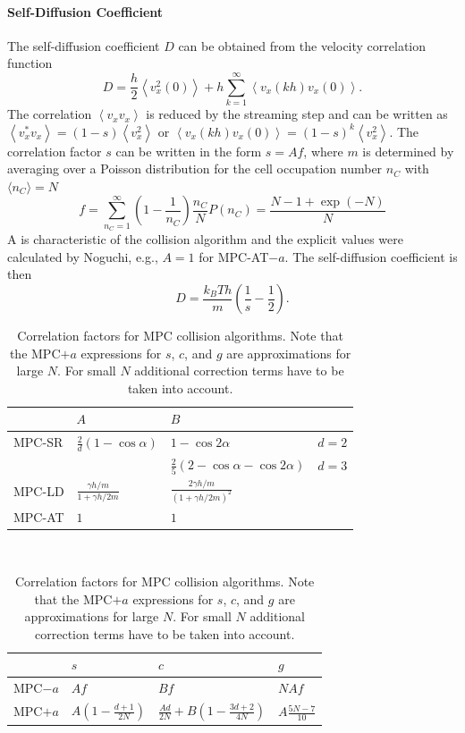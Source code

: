 \documentclass[8.5pt,twoside,twocolumn]{article}
\begin{document}
\paragraph{Self-Diffusion Coefficient}

The self-diffusion coefficient $D$ can be obtained from  the velocity correlation function
%
\begin{equation}
D= \frac{h}{2} \left\langle v_x^2(0) \right\rangle + h \sum_{k=1}^{\infty} \left\langle v_x(kh) v_x(0) \right\rangle .
\end{equation}
%
The correlation $\left\langle v_x v_x \right\rangle$ is reduced by the streaming step and can be written as $\left\langle v_x^* v_x \right\rangle = (1-s) \left\langle v_x^2 \right\rangle$ or $\left\langle v_x(kh) v_x(0) \right\rangle=(1-s)^k \left\langle v_x^2 \right\rangle$. The correlation factor $s$ can be written in the form $s=Af$, where $m$ is determined by averaging over a Poisson distribution for the cell occupation number $n_C$ with $\langle n_C \rangle = N$
%
\begin{equation}
  f = \sum_{n_C=1}^{\infty} \left(1-\frac{1}{n_C}\right) \frac{n_C}{N} P(n_C) = \frac{N-1+\exp(-N)}{N}
\end{equation}
%
A is characteristic of the collision algorithm and the explicit values were calculated by Noguchi\cite{Noguchi:2008}, e.g., $A=1$ for MPC-AT$-a$. The self-diffusion coefficient is then
%
\begin{equation}
  D %
  = \frac{k_B T h}{m} \left( \frac{1}{s} - \frac{1}{2} \right) .
\end{equation}

\begin{table}\centering
\begin{tabular}{l|l|l|l}
  \hline
  & $A$ & $B$ \\
  \hline
  MPC-SR & $\frac{2}{d}(1-\cos\alpha)$ & $1-\cos2\alpha$ & $d=2$ \\
  & & $\frac{2}{5}(2-\cos\alpha-\cos2\alpha)$ & $d=3$ \\
  MPC-LD & $\frac{\gamma h/m}{1+\gamma h/2m}$ & $\frac{2\gamma h/m}{(1+\gamma h/2m)^2}$ \\
  MPC-AT & $1$ & $1$ \\
  \hline
\end{tabular}
\vspace*{\baselineskip}\\
\begin{tabular}{llll}
\hline
  & $s$ & $c$ & $g$ \\
\hline
  MPC$-a$ & $Af$ & $Bf$ & $NAf$ \\
  MPC$+a$ & $A\left(1-\frac{d+1}{2N}\right)$ & $\frac{Ad}{2N}+B\left(1-\frac{3d+2}{4N}\right)$ & $A\frac{5N-7}{10}$ \\
\hline
\end{tabular}
\caption{Correlation factors for MPC collision algorithms. Note that the MPC$+a$ expressions for $s$, $c$, and $g$ are approximations for large $N$. For small $N$ additional correction terms have to be taken into account.\cite{Noguchi:2008}}
\label{tab:mpc-correlation-factors}
\end{table}
\end{document}
